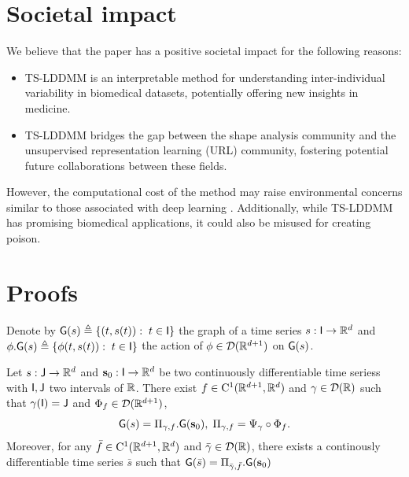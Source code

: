 



\section{Societal impact}
\label{appendix:societal_impact}
We believe that the paper has a positive societal impact for the following reasons:
\begin{itemize}
\item TS-LDDMM is an interpretable method for understanding inter-individual variability in biomedical datasets, potentially offering new insights in medicine.
\item TS-LDDMM bridges the gap between the shape analysis community and the unsupervised representation learning (URL) community, fostering potential future collaborations between these fields.
\end{itemize}
However, the computational cost of the method may raise environmental concerns similar to those associated with deep learning \cite{oh2024stable}.
 Additionally, while TS-LDDMM has promising biomedical applications, it could also be misused for creating poison.
\section{Proofs}
\label{appendix:proofs}
Denote by $\mathsf{G}(s)\triangleq \{ (t,s(t)): \; t\in \mathsf{I} \} $ the graph of a time series $s: \mathsf{I} \to \mathbb{R}^d$ and $ \phi.\mathsf{G}(s)\triangleq\{ \phi(t,s(t)): \; t\in \mathsf{I}\} $ the action of  $\phi\in \mathcal{D}(\mathbb{R}^{d+1}) $ on $\mathsf{G}(s)$.
\begin{theorem}
    \label{theorem:representation_proof}
Let $s:  \mathsf{J} \to \mathbb{R}^d  $ and $\mathbf{s}_0: \mathsf{I}\to \mathbb{R}^d $ be two continuously differentiable time seriess with $\mathsf{I},\mathsf{J}$ two intervals of $\mathbb{R}$.
 There exist $f\in \mathrm{C}^1(\mathbb{R}^{d+1},\mathbb{R}^d)$ and $\gamma\in  \mathcal{D}(\mathbb{R}) $ such that $\gamma(\mathsf{I})=\mathsf{J} $ and $\Phi_f\in \mathcal{D}(\mathbb{R}^{d+1})$,
 \begin{equation}
    \mathsf{G}(s)= \Pi_{\gamma,f}.\mathsf{G}(\mathbf{s}_0),\; \Pi_{\gamma,f}=\Psi_\gamma\circ\Phi_f.
 \end{equation}
 Moreover, for any $\bar{f}\in \mathrm{C}^1(\mathbb{R}^{d+1},\mathbb{R}^d)$ and $\bar{\gamma}\in  \mathcal{D}(\mathbb{R}) $, there exists a continously differentiable time series $\bar{s}$ such that 
 $\mathsf{G}(\bar{s})= \Pi_{\bar{\gamma},\bar{f}}.\mathsf{G}(\mathbf{s}_0)$
\end{theorem}

